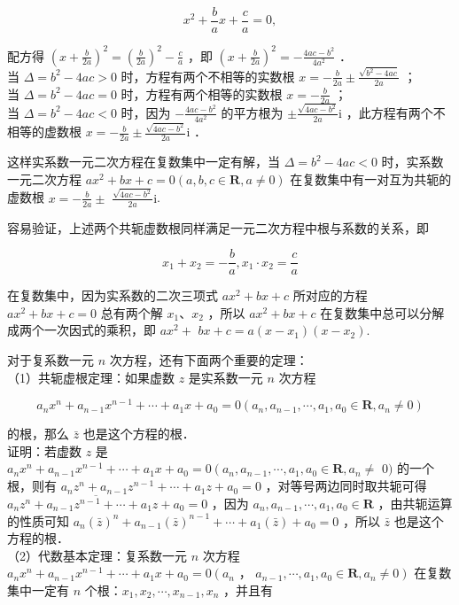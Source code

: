 \documentclass[10pt]{article}
\begin{document}
\[
x^{2}+\frac{b}{a} x+\frac{c}{a}=0,
\]

配方得 \(\left(x+\frac{b}{2 a}\right)^{2}=\left(\frac{b}{2 a}\right)^{2}-\frac{c}{a}\) ，即 \(\left(x+\frac{b}{2 a}\right)^{2}=-\frac{4 a c-b^{2}}{4 a^{2}}\) ．\\
当 \(\Delta=b^{2}-4 a c>0\) 时，方程有两个不相等的实数根 \(x=-\frac{b}{2 a} \pm \frac{\sqrt{b^{2}-4 a c}}{2 a}\) ；\\
当 \(\Delta=b^{2}-4 a c=0\) 时，方程有两个相等的实数根 \(x=-\frac{b}{2 a}\) ；\\
当 \(\Delta=b^{2}-4 a c<0\) 时，因为 \(-\frac{4 a c-b^{2}}{4 a^{2}}\) 的平方根为 \(\pm \frac{\sqrt{4 a c-b^{2}}}{2 a} \mathrm{i}\) ，此方程有两个不相等的虚数根 \(x=-\frac{b}{2 a} \pm \frac{\sqrt{4 a c-b^{2}}}{2 a} \mathrm{i}\) ．

这样实系数一元二次方程在复数集中一定有解，当 \(\Delta=b^{2}-4 a c<0\) 时，实系数一元二次方程 \(a x^{2}+b x+c=0(a, b, c \in \mathbf{R}, a \neq 0)\) 在复数集中有一对互为共轭的虚数根 \(x=-\frac{b}{2 a} \pm\) \(\frac{\sqrt{4 a c-b^{2}}}{2 a} \mathrm{i}\).

容易验证，上述两个共轭虚数根同样满足一元二次方程中根与系数的关系，即

\[
x_{1}+x_{2}=-\frac{b}{a}, x_{1} \cdot x_{2}=\frac{c}{a}
\]

在复数集中，因为实系数的二次三项式 \(a x^{2}+b x+c\) 所对应的方程 \(a x^{2}+b x+c=0\) 总有两个解 \(x_{1} 、 x_{2}\) ，所以 \(a x^{2}+b x+c\) 在复数集中总可以分解成两个一次因式的乘积，即 \(a x^{2}+\) \(b x+c=a\left(x-x_{1}\right)\left(x-x_{2}\right)\).

对于复系数一元 \(n\) 次方程，还有下面两个重要的定理：\\
（1）共轭虚根定理：如果虚数 \(z\) 是实系数一元 \(n\) 次方程

\[
a_{n} x^{n}+a_{n-1} x^{n-1}+\cdots+a_{1} x+a_{0}=0\left(a_{n}, a_{n-1}, \cdots, a_{1}, a_{0} \in \mathbf{R}, a_{n} \neq 0\right)
\]

的根，那么 \(\bar{z}\) 也是这个方程的根．\\
证明：若虚数 \(z\) 是 \(a_{n} x^{n}+a_{n-1} x^{n-1}+\cdots+a_{1} x+a_{0}=0\left(a_{n}, a_{n-1}, \cdots, a_{1}, a_{0} \in \mathbf{R}, a_{n} \neq\right.\) \(0)\) 的一个根，则有 \(a_{n} z^{n}+a_{n-1} z^{n-1}+\cdots+a_{1} z+a_{0}=0\) ，对等号两边同时取共轭可得 \(\overline{a_{n} z^{n}+a_{n-1} z^{n-1}+\cdots+a_{1} z+a_{0}}=0\) ，因为 \(a_{n}, a_{n-1}, \cdots, a_{1}, a_{0} \in \mathbf{R}\) ，由共轭运算的性质可知 \(a_{n}(\bar{z})^{n}+a_{n-1}(\bar{z})^{n-1}+\cdots+a_{1}(\bar{z})+a_{0}=0\) ，所以 \(\bar{z}\) 也是这个方程的根．\\
（2）代数基本定理：复系数一元 \(n\) 次方程 \(a_{n} x^{n}+a_{n-1} x^{n-1}+\cdots+a_{1} x+a_{0}=0\left(a_{n}\right.\) ， \(\left.a_{n-1}, \cdots, a_{1}, a_{0} \in \mathbf{R}, a_{n} \neq 0\right)\) 在复数集中一定有 \(n\) 个根：\(x_{1}, x_{2}, \cdots, x_{n-1}, x_{n}\) ，并且有
\end{document}
